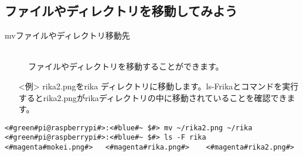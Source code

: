 \subsection{ファイルやディレクトリを移動してみよう}
\begin{description}
\item[mv\textvisiblespace ファイルやディレクトリ\textvisiblespace 移動先]\mbox{}\\
ファイルやディレクトリを移動することができます。
\end{description}
\begin{itemize}
\item[<例>]rika2.pngをrika ディレクトリに移動します。ls\textvisiblespace -F\textvisiblespace rikaとコマンドを実行するとrika2.pngがrikaディレクトリの中に移動されていることを確認できます。
\end{itemize}
\begin{lstlisting}[caption=mvの例, label=mv]
<#green#pi@raspberrypi#>:<#blue#~ $#> mv ~/rika2.png ~/rika
<#green#pi@raspberrypi#>:<#blue#~ $#> ls -F rika
<#magenta#mokei.png#>	<#magenta#rika.png#>	<#magenta#rika2.png#>
\end{lstlisting}

\begin{tcolorbox}[title=\useOmetoi]
\begin{enumerate}
\end{enumerate}
\end{tcolorbox}
